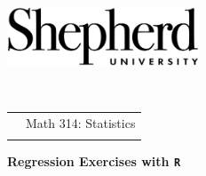 \documentclass[10pt]{article}
\begin{document}
\pagestyle{empty}

\href{http://www.shepherd.edu}{\includegraphics[height=1.75cm]{logo-high-res.eps}}
\vspace{-1.69cm}

{\small{\ }\hfill
\begin{tabular}{cl}
& Math 314:  Statistics\\
                & %
\end{tabular}
}
\medskip

\begin{center}
\textbf{\large Regression Exercises with \texttt{R}}
\end{center}
\medskip
\end{document}
